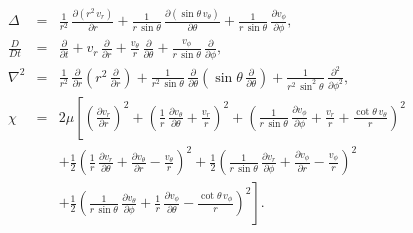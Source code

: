 \begin{eqnarray}
\Delta&=&\frac{1}{r^2}\,\frac{\partial (r^2\,v_r)}{\partial r} +\frac{1}{r\,\sin\theta}\, \frac{\partial (\sin\theta\,v_\theta)}{\partial \theta} + \frac{1}{r\,\sin\theta}\,\frac{\partial v_\phi}{\partial \phi},\\[0.5ex]
\frac{D}{Dt} &=& \frac{\partial}{\partial t} + v_r\,\frac{\partial }{\partial r} + \frac{v_\theta}{r}\,\frac{\partial}{\partial \theta} + \frac{v_\phi}{r\,\sin\theta}\,\frac{\partial}{\partial \phi},\\[0.5ex]
\nabla^2 &=&\frac{1}{r^2}\,\frac{\partial}{\partial r}\!\left(r^2\,\frac{\partial}{\partial r} \right)+\frac{1}{r^2\,\sin\theta}\, \frac{\partial}{\partial \theta}\!\left(\sin\theta\,\frac{\partial}{\partial\theta}\right)+\frac{1}{r^2\,\sin^2\theta}\,\frac{\partial^2}{\partial \phi^2},\\[0.5ex]
\chi &=&2\mu\left[\left(\frac{\partial v_r}{\partial r}\right)^2+\left(\frac{1}{r}\,\frac{\partial v_\theta}{\partial \theta}+\frac{v_r}{r}\right)^2+
\left(\frac{1}{r\,\sin\theta}\,\frac{\partial v_\phi}{\partial \phi}+\frac{v_r}{r}+\frac{\cot\theta\,v_\theta}{r}\right)^2\right.\nonumber\\[0.5ex]&&+\frac{1}{2}\left(\frac{1}{r}\,\frac{\partial v_r}{\partial \theta}+\frac{\partial v_\theta}{\partial r}-\frac{v_\theta}{r}\right)^2+\frac{1}{2}\left(\frac{1}{r\,\sin\theta}\,\frac{\partial v_r}{\partial \phi}+\frac{\partial v_\phi}{\partial r}-\frac{v_\phi}{r}\right)^2\nonumber\\[0.5ex]
&&\left.+\frac{1}{2}\left(\frac{1}{r\,\sin\theta}\,\frac{\partial v_\theta}{\partial \phi}+\frac{1}{r}\,\frac{\partial v_\phi}{\partial \theta}-\frac{\cot\theta\,v_\phi}{r}\right)^2\right].
\end{eqnarray}

